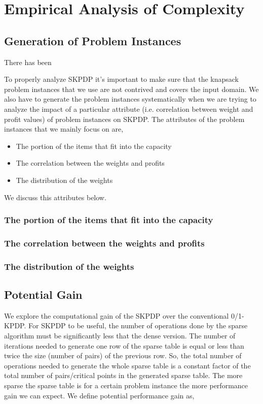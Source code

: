 \chapter{Empirical Analysis of Complexity}

\label{chap:analysis}

\section{Generation of Problem Instances}

There has been 

To properly analyze SKPDP it's important to make sure that the knapsack problem instances that we use are not contrived and covers the input domain. We also have to generate the problem instances systematically when we are trying to analyze the impact of a particular attribute (i.e. correlation between weight and profit values) of problem instances on SKPDP. The attributes of the problem instances that we mainly focus on are, 

\begin{itemize}
\item The portion of the items that fit into the capacity
\item The correlation between the weights and profits
\item The distribution of the weights
\end{itemize}

We discuss this attributes below.
\subsection{The portion of the items that fit into the capacity}


\subsection{The correlation between the weights and profits}

\subsection{The distribution of the weights}







\section{Potential Gain}
We explore the computational gain of the SKPDP over the conventional 0/1-KPDP.
For SKPDP to be useful, the number of operations done by the sparse algorithm
must be significantly less that the dense version.  The number of iterations
needed to generate one row of the sparse table is equal or less than twice the
size (number of pairs) of the previous row.  So, the total number of
operations needed to generate the whole sparse table is a constant factor of
the total number of pairs/critical points in the generated sparse table.  The
more sparse the sparse table is for a certain problem instance the more
performance gain we can expect.  We define potential performance gain as,

